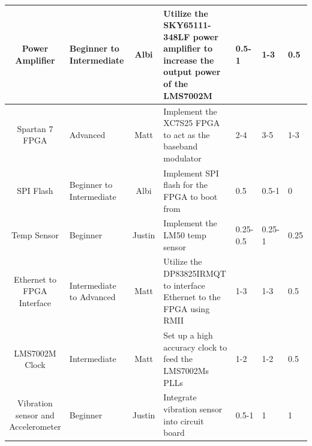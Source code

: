 \documentclass[crop=false]{standalone}
\begin{document}
\begin{landscape}
\begin{longtable}[c]{|c|m{2cm}|c|m{4cm}|m{2cm}|m{2cm}|m{2cm}|}
            Power Amplifier & \raggedright Beginner to Intermediate & Albi & \raggedright Utilize the SKY65111-348LF power amplifier to increase the output power of the LMS7002M & 0.5-1 & 1-3 & 0.5 \\ \hline
            Spartan 7 FPGA & Advanced & Matt & \raggedright Implement the XC7S25 FPGA to act as the baseband modulator & 2-4 & 3-5 & 1-3 \\ \hline
            SPI Flash & \raggedright Beginner to Intermediate & Albi & \raggedright Implement SPI flash for the FPGA to boot from & 0.5 & 0.5-1 & 0 \\ \hline
            Temp Sensor & Beginner & Justin & \raggedright Implement the LM50 temp sensor & 0.25-0.5 & 0.25-1 & 0.25   \\ \hline
            Ethernet to FPGA Interface & \raggedright Intermediate to Advanced & Matt & \raggedright Utilize the DP83825IRMQT to interface Ethernet to the FPGA using RMII & 1-3 & 1-3 & 0.5 \\ \hline
           LMS7002M Clock & \raggedright Intermediate & Matt & \raggedright Set up a high accuracy clock to feed the LMS7002Ms PLLs & 1-2 & 1-2 & 0.5 \\ \hline
            Vibration sensor and Accelerometer & Beginner & Justin & \raggedright Integrate vibration sensor into circuit board & 0.5-1 & 1 & 1 \\
            \hline
            \end{longtable}
            
        \end{landscape}
        
            
\end{document}
